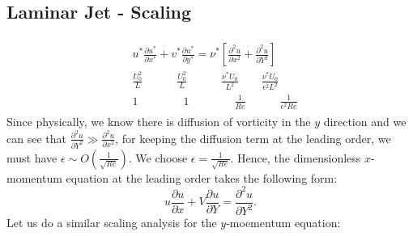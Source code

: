 \documentclass{article}
\begin{document}
\subsection{Laminar Jet - Scaling}

\begin{align}\label{eq:jet-x-mom-scaling}
 \begin{split}
  & u^{*}\frac{\partial u^{*}}{\partial x^{*}} + v^{*} \frac{\partial u^{*}}{\partial y^{*}} = \nu^{*}  \left[ \frac{\partial^{2} u}{\partial x^{2}} + \frac{\partial^{2} u}{\partial Y^{2}}\right]\\
  & \frac{U_{0}^{2}}{L} \quad \quad \quad \frac{U_{0}^{2}}{L} \quad \quad \quad  \frac{\nu ^{*}U_{0}}{L^{2}} \quad \quad  \frac{\nu ^{*}U_{0}}{\epsilon^{2} L^{2}}\\
  & 1 \quad \quad \quad \quad 1 \quad \quad \quad \quad \frac{1}{Re} \quad \quad \quad \frac{1}{\epsilon^{2} Re}
 \end{split}
\end{align}
%
Since physically, we know there is diffusion of vorticity in the $y$ direction and we can see that $ \frac{\partial^{2} u}{\partial Y^{2}} \gg \frac{\partial^{2} u}{\partial x^{2}} $, for keeping the diffusion term at the leading order, we must have $\epsilon \sim O( \frac{1}{\sqrt{Re}} )$. We choose $\boxed{\epsilon = \frac{1}{\sqrt{Re} } }$. Hence, the dimensionless $x$-momentum equation at the leading order takes the following form:
\begin{equation}\label{eq:jet-x-mom-dimless}
 u \frac{\partial u}{\partial x} + V \frac{\partial u}{\partial Y} = \frac{\partial^{2} u}{\partial Y^{2}}. 
\end{equation}
%
Let us do a similar scaling analysis for the $y$-moementum equation:
\end{document}
